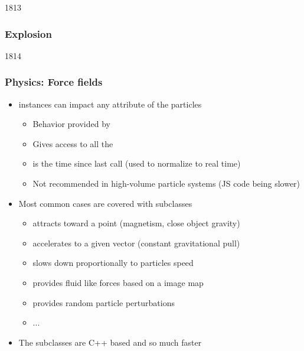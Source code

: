 \begin{slide}{1813}\frametitle{Explosion}


\vspace*{-20em}\hfill{}
\end{slide}


\begin{slide}{1814}\frametitle{Physics: Force fields}

\begin{itemize}
\item {} instances can impact any attribute of the particles
  \begin{itemize}
  \item Behavior provided by 
  \item Gives access to all the 
  \item {} is the time since last call (used to normalize to real time)
  \item Not recommended in high-volume particle systems (JS code being slower)
  \end{itemize}
\vspace*{0.5em}
\item Most common cases are covered with  subclasses
  \begin{itemize}
  \item {} attracts toward a point (magnetism, close object gravity)\linebreak{}
  \item {} accelerates to a given vector (constant gravitational pull)
  \item {} slows down proportionally to particles speed
  \item {} provides fluid like forces based on a  image map
  \item {} provides random particle perturbations
  \item ...
  \end{itemize}
\vspace*{0.5em}
\item The subclasses are C++ based and so much faster
\end{itemize}

\end{slide}

